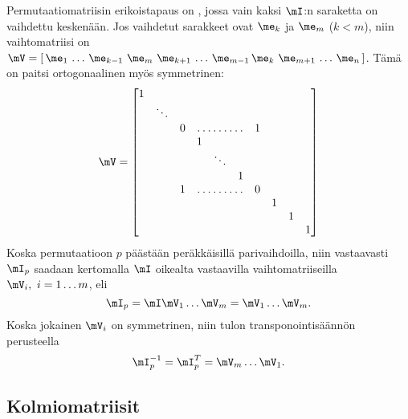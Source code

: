 Permutaatiomatriisin erikoistapaus on , jossa vain kaksi $\mI$:n saraketta
on vaihdettu keskenään. Jos vaihdetut sarakkeet ovat $\me_k$ ja $\me_m$ ($k<m$), niin
vaihtomatriisi on $\mV = [\,\me_1\,\ldots\,\me_{k-1}\ \me_m\ \me_{k+1}\,\ldots\,\me_{m-1}\,
\me_k\ \me_{m+1}\,\ldots\,\me_n\,]$. Tämä on paitsi ortogonaalinen myös symmetrinen:
\[
\mV= \begin{bmatrix}
1 \\
& \ddots \\
& & 0 & \hdotsfor{3} & 1 \\
& & & 1 \\
& & & & \ddots \\
& & & & & 1 \\
& & 1 & \hdotsfor{3} & 0 \\
& & & & & & & 1 \\
& & & & & & & & 1 \\
& & & & & & & & &1 \\
\end{bmatrix}
\]
Koska permutaatioon $p$ päästään peräkkäisillä parivaihdoilla, niin vastaavasti $\mI_p$
saadaan kertomalla $\mI$ oikealta vastaavilla vaihtomatriiseilla $\mV_i,\ i=1 \ldots m$, eli
\[
\mI_p = \mI\mV_1 \ldots \mV_m = \mV_1 \ldots \mV_m.
\]
Koska jokainen $\mV_i$ on symmetrinen, niin tulon transponointisäännön perusteella
\[
\mI_p^{-1} = \mI_p^T = \mV_m \ldots \mV_1.
\]

\subsection{Kolmiomatriisit}

